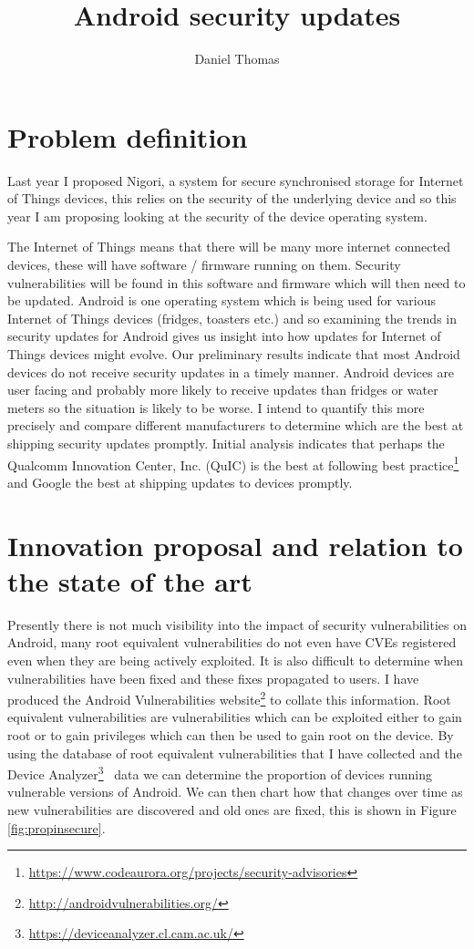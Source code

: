 \documentclass[a4paper,twocolumn]{article}
\author{Daniel Thomas}
\title{Android security updates}
\date{}%
\begin{document}
\maketitle

\section*{Problem definition}
Last year I proposed Nigori, a system for secure synchronised storage for Internet of Things devices, this relies on the security of the underlying device and so this year I am proposing looking at the security of the device operating system.

The Internet of Things means that there will be many more internet connected devices, these will have software / firmware running on them.
Security vulnerabilities will be found in this software and firmware which will then need to be updated.
Android is one operating system which is being used for various Internet of Things devices (fridges, toasters etc.) and so examining the trends in security updates for Android gives us insight into how updates for Internet of Things devices might evolve.
Our preliminary results indicate that most Android devices do not receive security updates in a timely manner.
Android devices are user facing and probably more likely to receive updates than fridges or water meters so the situation is likely to be worse.
I intend to quantify this more precisely and compare different manufacturers to determine which are the best at shipping security updates promptly.
Initial analysis indicates that perhaps the Qualcomm Innovation Center, Inc. (QuIC) is the best at following best practice\footnote{\url{https://www.codeaurora.org/projects/security-advisories}} and Google the best at shipping updates to devices promptly.


\section*{Innovation proposal and relation to the state of the art}
Presently there is not much visibility into the impact of security vulnerabilities on Android, many root equivalent vulnerabilities do not even have CVEs registered even when they are being actively exploited.
It is also difficult to determine when vulnerabilities have been fixed and these fixes propagated to users.
I have produced the Android Vulnerabilities website\footnote{\url{http://androidvulnerabilities.org/}} to collate this information.
Root equivalent vulnerabilities are vulnerabilities which can be exploited either to gain root or to gain privileges which can then be used to gain root on the device.
By using the database of root equivalent vulnerabilities that I have collected and the Device Analyzer\footnote{\url{https://deviceanalyzer.cl.cam.ac.uk/}}~\cite{TODO} data we can determine the proportion of devices running vulnerable versions of Android.
We can then chart how that changes over time as new vulnerabilities are discovered and old ones are fixed, this is shown in Figure \ref{fig:propinsecure}.
\end{document}
